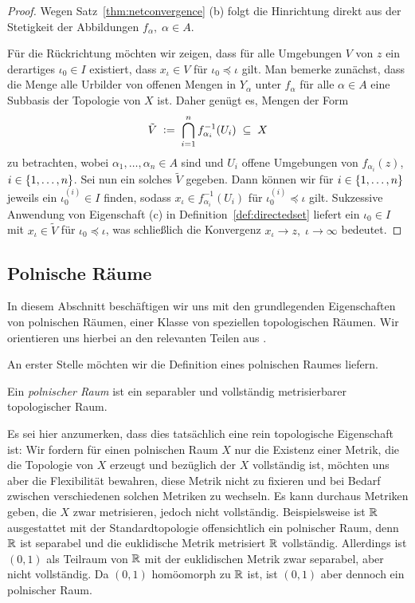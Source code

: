\documentclass[../main/main.tex]{subfiles}
\begin{document}
	\begin{proof}
		Wegen Satz~\ref{thm:netconvergence} (b) folgt die Hinrichtung direkt aus der Stetigkeit der Abbildungen $f_\alpha, \; \alpha \in A$.
		
		Für die Rückrichtung möchten wir zeigen, dass für alle Umgebungen $V$ von $z$ ein derartiges $\iota_0 \in I$ existiert, dass $x_\iota \in V$ für $\iota_0 \preceq \iota$ gilt.
		Man bemerke zunächst, dass die Menge alle Urbilder von offenen Mengen in $Y_\alpha$ unter $f_\alpha$ für alle $\alpha \in A$ eine Subbasis der Topologie von $X$ ist.
		Daher genügt es, Mengen der Form
		\[ \tilde{V} \; \vcentcolon = \; \bigcap_{i=1}^{n} f_{\alpha_i}^{-1}(U_i) \; \subseteq \; X \]
		zu betrachten, wobei $\alpha_1, \dots, \alpha_n \in A$ sind und $U_i$ offene Umgebungen von $f_{\alpha_i}(z)$, $i \in \left\{1, \dots, n\right\}$.
		Sei nun ein solches $\tilde{V}$ gegeben. Dann können wir für $i \in \left\{1, \dots, n\right\}$ jeweils ein $\iota_0^{(i)} \in I$ finden, sodass $x_\iota \in f_{\alpha_i}^{-1}(U_i)$ für 
		$\iota_0^{(i)} \preceq \iota$ gilt. Sukzessive Anwendung von Eigenschaft (c) in Definition~\ref{def:directedset} liefert ein $\iota_0 \in I$ mit 
		$x_\iota \in \tilde{V}$ für $\iota_0 \preceq \iota$, was schließlich die Konvergenz $x_\iota \to z, \; \iota \to \infty$ bedeutet.
	\end{proof}
	
	\subsection{Polnische Räume}
	
	In diesem Abschnitt beschäftigen wir uns mit den grundlegenden Eigenschaften von polnischen Räumen, 
	einer Klasse von speziellen topologischen Räumen. 
	Wir orientieren uns hierbei an den relevanten Teilen aus \cite[Kapitel 4.14]{Simon.2015}.
	
	An erster Stelle möchten wir die Definition eines polnischen Raumes liefern.
	
	\begin{Definition}
		Ein \emph{polnischer Raum} ist ein separabler und vollständig metrisierbarer topologischer Raum.
	\end{Definition}
	
	Es sei hier anzumerken, dass dies tatsächlich eine rein topologische Eigenschaft ist: Wir fordern für einen polnischen Raum $X$ nur die Existenz einer Metrik,
	die die Topologie von $X$ erzeugt und bezüglich der $X$ vollständig ist, möchten uns aber die Flexibilität
	bewahren, diese Metrik nicht zu fixieren und bei Bedarf zwischen verschiedenen solchen Metriken
	zu wechseln. Es kann durchaus Metriken geben, die $X$ zwar metrisieren, jedoch nicht vollständig.
	Beispielsweise ist $\mathbb{R}$ ausgestattet mit der Standardtopologie offensichtlich ein polnischer Raum,
	denn $\mathbb{R}$ ist separabel und die euklidische Metrik metrisiert $\mathbb{R}$ vollständig. 
	Allerdings ist $(0, 1)$ als Teilraum von $\mathbb{R}$ mit der euklidischen Metrik zwar separabel, aber nicht vollständig.
	Da $(0, 1)$ homöomorph zu $\mathbb{R}$ ist, ist $(0, 1)$ aber dennoch ein polnischer Raum.
	
\end{document}
